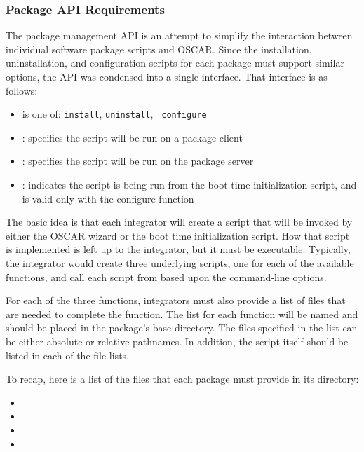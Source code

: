 \subsubsection{Package API Requirements}

The package management API is an attempt to simplify the interaction
between individual software package scripts and OSCAR.  Since the
installation, uninstallation, and configuration scripts for each
package must support similar options, the API was condensed into a
single interface. That interface is as follows:


\begin{itemize}
\item {} is one of: {\tt install}, {\tt uninstall}, {\tt
    configure}

\item {}: specifies the script will be run on a package client
  
\item {}: specifies the script will be run on the package server
  
\item {}: indicates the script is being run from the boot
  time initialization script, and is valid only with the configure
  function
\end{itemize}

The basic idea is that each integrator will create a
 script that will be invoked by either the OSCAR
wizard or the boot time initialization script. How that script is
implemented is left up to the integrator, but it must be executable. 
Typically, the integrator would create three underlying scripts, one 
for each of the available functions, and call each script from 
 based upon the command-line options.

For each of the three functions, integrators must also provide a list
of files that are needed to complete the function. The list for each
function will be named  and should be
placed in the package's base directory. The files specified in the
list can be either absolute or relative pathnames. In addition, the
 script itself should be listed in each of the file lists.

To recap, here is a list of the files that each package must provide
in its directory:

\begin{itemize}
\item {}
\item {}
\item {}
\item {}
\end{itemize}

